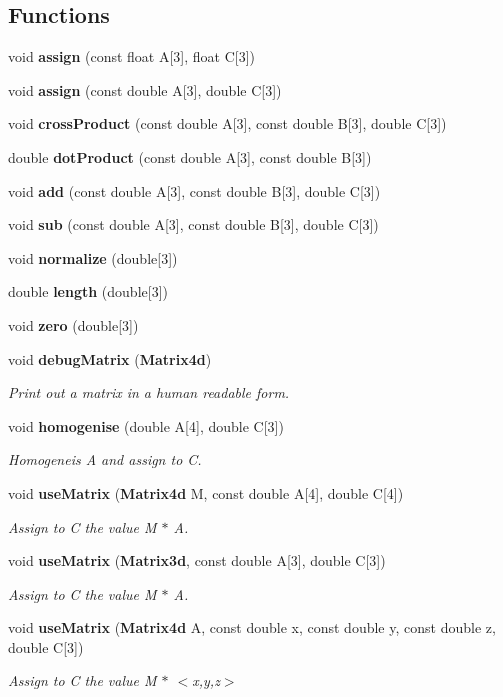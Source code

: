 \subsection*{Functions}
\begin{DoxyCompactItemize}
\item 
void {\bf assign} (const float A[3], float C[3])
\item 
void {\bf assign} (const double A[3], double C[3])
\item 
void {\bf cross\+Product} (const double A[3], const double B[3], double C[3])
\item 
double {\bf dot\+Product} (const double A[3], const double B[3])
\item 
void {\bf add} (const double A[3], const double B[3], double C[3])
\item 
void {\bf sub} (const double A[3], const double B[3], double C[3])
\item 
void {\bf normalize} (double[3])
\item 
double {\bf length} (double[3])
\item 
void {\bf zero} (double[3])
\item 
void {\bf debug\+Matrix} ({\bf Matrix4d})
\begin{DoxyCompactList}\small\item\em Print out a matrix in a human readable form. \end{DoxyCompactList}\item 
void {\bf homogenise} (double A[4], double C[3])
\begin{DoxyCompactList}\small\item\em Homogeneis A and assign to C. \end{DoxyCompactList}\item 
void {\bf use\+Matrix} ({\bf Matrix4d} M, const double A[4], double C[4])
\begin{DoxyCompactList}\small\item\em Assign to C the value M $\ast$ A. \end{DoxyCompactList}\item 
void {\bf use\+Matrix} ({\bf Matrix3d}, const double A[3], double C[3])
\begin{DoxyCompactList}\small\item\em Assign to C the value M $\ast$ A. \end{DoxyCompactList}\item 
void {\bf use\+Matrix} ({\bf Matrix4d} A, const double x, const double y, const double z, double C[3])
\begin{DoxyCompactList}\small\item\em Assign to C the value M $\ast$ $<$x,y,z$>$ \end{DoxyCompactList}\item 

\end{DoxyCompactItemize}
